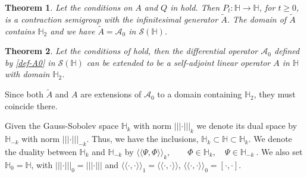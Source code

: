 \documentclass[]{interact}
\theoremstyle{plain}%
\newtheorem{theorem}{Theorem}[section]
\theoremstyle{definition}
\theoremstyle{remark}
\begin{document}
    \begin{theorem}\label{the-Pt-A}
        Let the conditions on $A$ and $Q$ in  hold.
        Then \sloppy ${P_t: \mathbb{H}\rightarrow \mathbb{H}}$, for $t \ge 0$, 
        is a contraction semigroup with the infinitesimal generator $\tilde{A}$.
        The domain of $\tilde{A}$ contains $\mathbb{H}_{2}$ and we have
        $\tilde{A} =\mathcal{A}_0 $ in $\mathcal{S}(\mathbb{H})$.
    \end{theorem}

    \begin{theorem}\label{the-Pt-A1}
        Let the conditions of  hold, then the differential
        operator $\mathcal{A}_0 $  defined by \eqref{def-A0} in
        $\mathcal{S}(\mathbb{H})$ can be extended to be a self-adjoint
        linear operator $A$ in $\mathbb{H}$ with domain $\mathbb{H}_{2}$.
    \end{theorem}
%
        Since both $\tilde{A}$ and $A$ are extensions of $\mathcal{A}_0 $ to a
    domain containing $\mathbb{H}_{2}$, they must coincide there.

    Given the Gauss-Sobolev space $\mathbb{H}_{k}$ with norm
    $|||\cdot|||_{k} $ we denote its dual space by $\mathbb{H}_{-k}$ with norm
    $|||\cdot|||_{-k}$. Thus, we have the inclusions,
    $
        \mathbb{H}_{k} \subset \mathbb{H} \subset \mathbb{H}_{k}.
    $
    We denote the duality between $ \mathbb{H}_{k}$ and $ \mathbb{H}_{-k}$ by
    $
        \langle
            \langle
                \Psi,\Phi
            \rangle
        \rangle_k,
        \qquad
        \Phi\in\mathbb{H}_{k},
        \quad \Psi\in\mathbb{H}_{-k} \ .
    $
    We also set $\mathbb{H}_{0}= \mathbb{H}$,
    with $|||\cdot|||_{0}= |||\cdot|||$ and
    $
        \langle
            \langle
                \cdot,\cdot
            \rangle
        \rangle_1=
        \langle
            \langle
                \cdot,\cdot
            \rangle
        \rangle
    $,
    $
        \langle
            \langle
                \cdot,\cdot
            \rangle
        \rangle_0 = [\cdot,\cdot]
    $.
\end{document}
